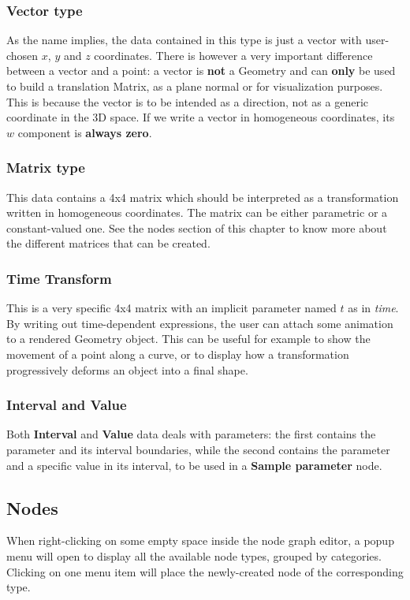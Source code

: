 \subsubsection{Vector type}
As the name implies, the data contained in this type is just a vector with
user-chosen $x$, $y$ and $z$ coordinates. There is however a very important
difference between a vector and a point: a vector is \textbf{not} a Geometry and
can \textbf{only} be used to build a translation Matrix, as a plane normal or for
visualization purposes. This is because the vector is to be intended as a direction,
not as a generic coordinate in the 3D space. If we write a vector
in homogeneous coordinates, its $w$ component is \textbf{always zero}.

\subsubsection{Matrix type}
This data contains a 4x4 matrix which should be interpreted as a transformation written in
homogeneous coordinates. The matrix can be either parametric or a constant-valued one.
See the nodes section of this chapter to know more about the different matrices that can
be created.

\subsubsection{Time Transform}
This is a very specific 4x4 matrix with an implicit parameter named $t$ as in \textit{time}.
By writing out time-dependent expressions, the user can attach some animation to 
a rendered Geometry object. This can be useful for example to show the movement of a
point along a curve, or to display how a transformation progressively deforms an object
into a final shape.

\subsubsection{Interval and Value}
Both \textbf{Interval} and \textbf{Value} data deals with parameters: the first contains
the parameter and its interval boundaries, while the second contains the parameter and
a specific value in its interval, to be used in a \textbf{Sample parameter} node.

\subsection{Nodes}
When right-clicking on some empty space inside the node graph editor, a popup menu
will open to display all the available node types, grouped by categories.
Clicking on one menu item will place the newly-created node of the corresponding type.

